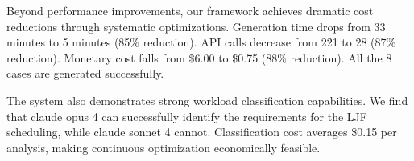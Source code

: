Beyond performance improvements, our framework achieves dramatic cost reductions through systematic optimizations. Generation time drops from 33 minutes to 5 minutes (85\% reduction). API calls decrease from 221 to 28 (87\% reduction). Monetary cost falls from \$6.00 to \$0.75 (88\% reduction). All the 8 cases are generated successfully.

The system also demonstrates strong workload classification capabilities. We find that claude opus 4 can successfully identify the requirements for the LJF scheduling, while claude sonnet 4 cannot. Classification cost averages \$0.15 per analysis, making continuous optimization economically feasible.